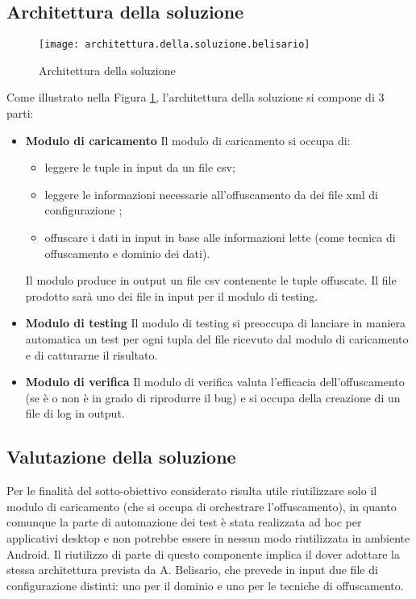 \subsection{Architettura della soluzione}
 \begin{figure}[H]
	\texttt{[image: architettura.della.soluzione.belisario]}
	\centering
	\caption[]{Architettura della soluzione \footnotemark }
    \label{fig:arch1}
\end{figure}
\noindent Come illustrato nella Figura \ref{fig:arch1}, l'architettura della soluzione si compone di 3 parti:
\begin{itemize} [nosep]
\item \textbf{Modulo di caricamento} \newline
Il modulo di caricamento si occupa di:
\begin{itemize} [nosep]
\item  leggere le tuple in input da un file csv; 
\item leggere le informazioni necessarie all'offuscamento da dei file xml di configurazione ;
\item offuscare i dati in input in base alle informazioni lette (come tecnica di offuscamento e dominio dei dati).
 \end{itemize}
Il modulo produce in output un file csv contenente le tuple offuscate. Il file prodotto sarà uno dei file in input per il modulo di testing.
\item  \textbf{Modulo di testing} \newline
Il modulo di testing si preoccupa di lanciare in maniera automatica un test per ogni tupla del file ricevuto dal modulo di caricamento e di catturarne il risultato. 
\item  \textbf{Modulo di verifica} \newline
Il modulo di verifica valuta l'efficacia dell'offuscamento (se è o non è in grado di riprodurre il bug) e si occupa della creazione di un file di log in output.
\end{itemize}

\subsection{Valutazione della soluzione}
Per le finalità del sotto-obiettivo considerato risulta utile riutilizzare solo il modulo di caricamento (che si occupa di orchestrare l'offuscamento), in quanto comunque la parte di automazione dei test è stata realizzata ad hoc per applicativi desktop  e non potrebbe essere in nessun modo riutilizzata in ambiente Android.  Il riutilizzo di parte di questo componente implica il dover adottare la stessa architettura prevista da A. Belisario, che prevede in input due file di configurazione distinti: uno per il dominio e uno per le tecniche di offuscamento. 

